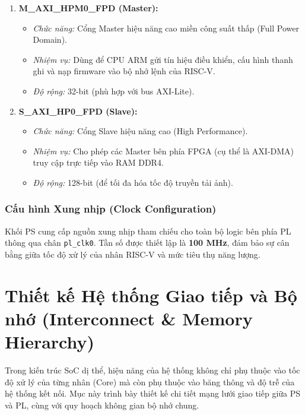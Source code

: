 \begin{enumerate}
    \item \textbf{M\_AXI\_HPM0\_FPD (Master):}
    \begin{itemize}
        \item \textit{Chức năng:} Cổng Master hiệu năng cao miền công suất thấp (Full Power Domain).
        \item \textit{Nhiệm vụ:} Dùng để CPU ARM gửi tín hiệu điều khiển, cấu hình thanh ghi và nạp firmware vào bộ nhớ lệnh của RISC-V.
        \item \textit{Độ rộng:} 32-bit (phù hợp với bus AXI-Lite).
    \end{itemize}
    
    \item \textbf{S\_AXI\_HP0\_FPD (Slave):}
    \begin{itemize}
        \item \textit{Chức năng:} Cổng Slave hiệu năng cao (High Performance).
        \item \textit{Nhiệm vụ:} Cho phép các Master bên phía FPGA (cụ thể là AXI-DMA) truy cập trực tiếp vào RAM DDR4.
        \item \textit{Độ rộng:} 128-bit (để tối đa hóa tốc độ truyền tải ảnh).
    \end{itemize}
\end{enumerate}

\subsubsection{Cấu hình Xung nhịp (Clock Configuration)}
Khối PS cung cấp nguồn xung nhịp tham chiếu cho toàn bộ logic bên phía PL 
thông qua chân \texttt{pl\_clk0}. Tần số được thiết lập là \textbf{100 MHz}, 
đảm bảo sự cân bằng giữa tốc độ xử lý của nhân RISC-V và mức tiêu thụ năng lượng.

\newpage
\section{Thiết kế Hệ thống Giao tiếp và Bộ nhớ (Interconnect \& Memory Hierarchy)}
\label{sec:interconnect_design}

Trong kiến trúc SoC dị thể, hiệu năng của hệ thống không chỉ phụ thuộc vào tốc độ xử lý của từng nhân (Core) mà còn phụ thuộc vào băng thông và độ trễ của hệ thống kết nối. Mục này trình bày thiết kế chi tiết mạng lưới giao tiếp giữa PS và PL, cùng với quy hoạch không gian bộ nhớ chung.

